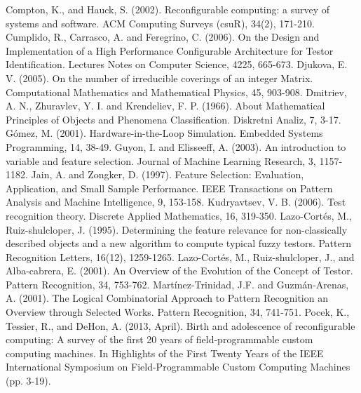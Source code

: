 \documentclass[authoryear,preprint,review,12pt]{elsarticle}
\begin{document}

\begin{thebibliography}{00}

Compton, K., and Hauck, S. (2002). Reconfigurable computing: a survey of systems and software. ACM Computing Surveys (csuR), 34(2), 171-210.
 Cumplido, R., Carrasco, A. and Feregrino, C. (2006). On the Design and Implementation of a High Performance Configurable Architecture for Testor Identification. Lectures Notes on Computer Science, 4225, 665-673.
Djukova, E. V. (2005). On the number of irreducible coverings of an integer Matrix. Computational Mathematics and Mathematical Physics, 45, 903-908.
 Dmitriev, A. N.,  Zhuravlev, Y. I. and Krendeliev, F. P. (1966). About Mathematical Principles of Objects and Phenomena Classification. Diskretni Analiz, 7, 3-17.
G\'omez, M. (2001). Hardware-in-the-Loop Simulation. Embedded Systems Programming, 14, 38-49.
Guyon, I. and Elisseeff, A. (2003). An introduction to variable and feature selection. Journal of Machine Learning Research, 3, 1157-1182.
Jain, A. and Zongker, D. (1997). Feature Selection: Evaluation, Application, and Small Sample Performance. IEEE Transactions on Pattern Analysis and Machine Intelligence, 9, 153-158.
Kudryavtsev, V. B. (2006). Test recognition theory. Discrete Applied Mathematics, 16, 319-350.
Lazo-Cort\'es, M., Ruiz-shulcloper, J. (1995). Determining the feature relevance for non-classically described objects and a new algorithm to compute typical fuzzy testors. Pattern Recognition Letters, 16(12), 1259-1265.
Lazo-Cort\'es, M., Ruiz-shulcloper, J., and Alba-cabrera, E. (2001). An Overview of the Evolution of the Concept of Testor. Pattern Recognition, 34, 753-762.
Mart\'inez-Trinidad, J.F. and Guzm\'an-Arenas, A. (2001). The Logical Combinatorial Approach to Pattern Recognition an Overview through Selected Works. Pattern Recognition, 34, 741-751.
Pocek, K., Tessier, R., and DeHon, A. (2013, April). Birth and adolescence of reconfigurable computing: A survey of the first 20 years of field-programmable custom computing machines. In Highlights of the First Twenty Years of the IEEE International Symposium on Field-Programmable Custom Computing Machines (pp. 3-19).

\end{thebibliography}
\end{document}
